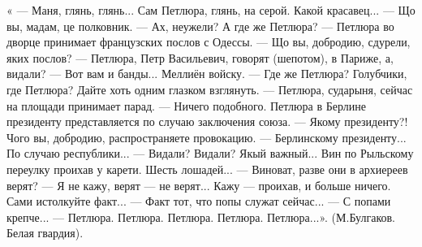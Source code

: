  
 
 
 
 


\obeycr
« — Маня, глянь, глянь... Сам Петлюра, глянь, на серой. Какой красавец...
— Що вы, мадам, це полковник.
— Ах, неужели? А где же Петлюра?
— Петлюра во дворце принимает французских послов с Одессы.
— Що вы, добродию, сдурели, яких послов?
— Петлюра, Петр Васильевич, говорят (шепотом), в Париже, а, видали?
— Вот вам и банды... Меллиён войску.
— Где же Петлюра? Голубчики, где Петлюра? Дайте хоть одним глазком взглянуть.
— Петлюра, сударыня, сейчас на площади принимает парад.
— Ничего подобного. Петлюра в Берлине президенту представляется по случаю заключения союза.
— Якому президенту?! Чого вы, добродию, распространяете провокацию.
— Берлинскому президенту... По случаю республики...
— Видали? Видали? Якый важный... Вин по Рыльскому переулку проихав у карети. Шесть лошадей...
— Виноват, разве они в архиереев верят?
— Я не кажу, верят — не верят... Кажу — проихав, и больше ничего. Сами истолкуйте факт...
— Факт тот, что попы служат сейчас...
— С попами крепче...
— Петлюра. Петлюра. Петлюра. Петлюра. Петлюра...».
(М.Булгаков. Белая гвардия).
\restorecr
